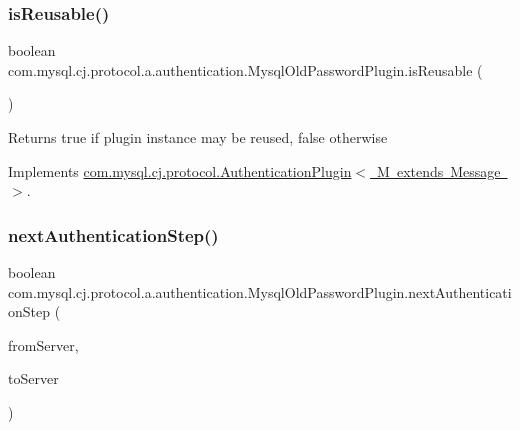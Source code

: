 \subsubsection{\texorpdfstring{is\+Reusable()}{isReusable()}}
{\footnotesize\ttfamily boolean com.\+mysql.\+cj.\+protocol.\+a.\+authentication.\+Mysql\+Old\+Password\+Plugin.\+is\+Reusable (\begin{DoxyParamCaption}{ }\end{DoxyParamCaption})}

\begin{DoxyReturn}{Returns}
true if plugin instance may be reused, false otherwise 
\end{DoxyReturn}


Implements \mbox{\hyperlink{interfacecom_1_1mysql_1_1cj_1_1protocol_1_1_authentication_plugin_afff2eda7e67e6847d2401461100e2c69}{com.\+mysql.\+cj.\+protocol.\+Authentication\+Plugin$<$ M extends Message $>$}}.

\mbox{\label{classcom_1_1mysql_1_1cj_1_1protocol_1_1a_1_1authentication_1_1_mysql_old_password_plugin_ada342ca352f7bbc0ec6f6d8b02e7d253}} 
\subsubsection{\texorpdfstring{next\+Authentication\+Step()}{nextAuthenticationStep()}}
{\footnotesize\ttfamily boolean com.\+mysql.\+cj.\+protocol.\+a.\+authentication.\+Mysql\+Old\+Password\+Plugin.\+next\+Authentication\+Step (\begin{DoxyParamCaption}\item[{\mbox{\hyperlink{classcom_1_1mysql_1_1cj_1_1protocol_1_1a_1_1_native_packet_payload}{Native\+Packet\+Payload}}}]{from\+Server,  }\item[{List$<$ \mbox{\hyperlink{classcom_1_1mysql_1_1cj_1_1protocol_1_1a_1_1_native_packet_payload}{Native\+Packet\+Payload}} $>$}]{to\+Server }\end{DoxyParamCaption})}


